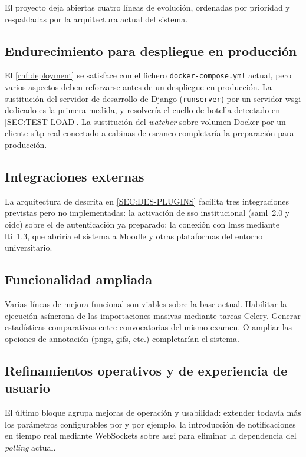 El proyecto deja abiertas cuatro líneas de evolución, ordenadas por
prioridad y respaldadas por la arquitectura actual del sistema.

\subsection{Endurecimiento para despliegue en producción}

El \cref{rnf:deployment} se satisface con el fichero
\texttt{docker-compose.yml} actual, pero varios aspectos deben reforzarse
antes de un despliegue en producción. La sustitución del servidor de
desarrollo de Django (\texttt{runserver}) por un servidor \acs{wsgi}
dedicado es la primera medida, y resolvería el cuello de
botella detectado en \cref{SEC:TEST-LOAD}. La
sustitución del \textit{watcher} sobre volumen Docker por un cliente
\acs{sftp} real conectado a cabinas de escaneo completaría la preparación para producción.

\subsection{Integraciones externas}

La arquitectura de  descrita en \cref{SEC:DES-PLUGINS}
facilita tres integraciones previstas pero no implementadas: la
activación de \acs{sso} institucional (\acs{saml}~2.0 y \acs{oidc}) sobre
el  de autenticación ya preparado; la
conexión con \acsp{lms} mediante \acs{lti}~1.3, que abriría el sistema a
Moodle y otras plataformas del entorno universitario.

\subsection{Funcionalidad ampliada}

Varias líneas de mejora funcional son viables sobre la base actual. Habilitar
la ejecución asíncrona de las importaciones masivas mediante tareas Celery.
Generar estadísticas comparativas entre convocatorias del mismo examen. O ampliar
las opciones de annotación (pngs, gifs, etc.) completarían el sistema.

\subsection{Refinamientos operativos y de experiencia de usuario}

El último bloque agrupa mejoras de operación y usabilidad: extender todavía
más los parámetros configurables por  y por ejemplo, la introducción
de notificaciones en tiempo real mediante WebSockets sobre
\acs{asgi} para eliminar la dependencia del \textit{polling} actual.
